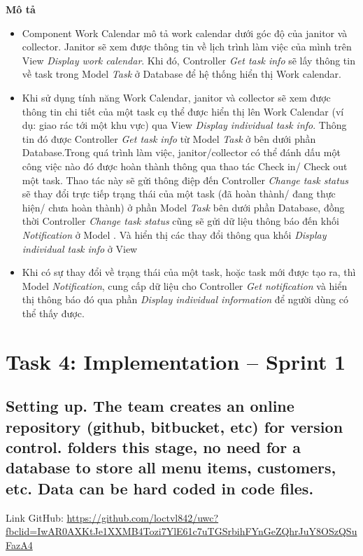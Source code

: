 \documentclass[a4paper]{article}
\begin{document}
\begin{enumerate}
\begin{figure}[!h]
\begin{center}
         \end{center}
     \end{figure}
     \textbf{Mô tả}
     \begin{itemize}
        \item Component Work Calendar mô tả work calendar dưới góc độ của janitor và collector. Janitor sẽ xem được thông tin về lịch trình làm việc của mình trên View \textit{Display work calendar}. Khi đó, Controller \textit{Get task info} sẽ lấy thông tin về task trong Model \textit{Task} ở Database để hệ thống hiển thị Work calendar.
         \item Khi sử dụng tính năng Work Calendar, janitor và collector sẽ xem được thông tin chi tiết của một task cụ thể được hiển thị lên Work Calendar (ví dụ: giao rác tới một khu vực) qua View \textit{Display individual task info}. Thông tin đó được Controller \textit{Get task info} từ Model \textit{Task} ở bên dưới phần Database.Trong quá trình làm việc, janitor/collector có thể đánh dấu một công việc nào đó được hoàn thành thông qua thao tác Check in/ Check out một task. Thao tác này sẽ gửi thông điệp đến Controller \textit{ Change task status} sẽ thay đổi trực tiếp trạng thái của một task (đã hoàn thành/ đang thực hiện/ chưa hoàn thành) ở phần Model \textit{Task} bên dưới phần Database, đồng thời Controller \textit{ Change task status} cũng sẽ gửi dữ liệu thông báo đến khối \textit{Notification} ở Model . Và hiển thị các thay đổi thông qua khối \textit{Display individual task info} ở View
         \item Khi có sự thay đổi về trạng thái của một task, hoặc task mới được tạo ra, thì Model \textit{Notification},  cung cấp dữ liệu cho Controller \textit{Get notification} và hiển thị thông báo đó qua phần \textit{Display individual information} để người dùng có thể thấy được.
 
     \end{itemize}
\end{enumerate}
\section{Task 4: Implementation – Sprint 1}
\subsection{Setting up. The team creates an online repository (github, bitbucket, etc) for version control. folders this stage, no need for a database to store all menu items, customers, etc. Data can be hard coded in code files.}
Link GitHub: \url{https://github.com/loctvl842/uwc?fbclid=IwAR0AXKtJe1XXMB4Tozi7YlE61c7uTGSrbihFYnGeZQhrJuY8OSzQSuFazA4}
\end{document}
